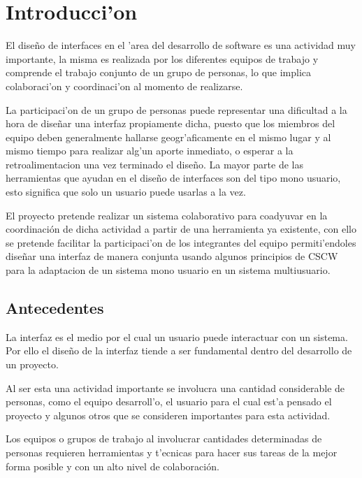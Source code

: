 \chapter{Introducci'on}
\label{capitulouno}

El dise\~no de interfaces en el 'area del desarrollo de software es una actividad muy importante, la misma es realizada por los diferentes equipos de trabajo y comprende el trabajo conjunto de un grupo de personas, lo que implica colaboraci'on y coordinaci'on al momento de realizarse.

\medskip

La participaci'on de un grupo de personas puede representar una dificultad a la hora de dise\~nar una interfaz propiamente dicha, puesto que los miembros del equipo deben generalmente hallarse geogr'aficamente en el mismo lugar y al mismo tiempo para realizar alg'un aporte inmediato, o esperar a la retroalimentacion una vez terminado el dise\~no. La mayor parte de las herramientas que ayudan en el dise\~no de interfaces son del tipo mono usuario, esto significa que solo un usuario puede usarlas a la vez.

\medskip

El proyecto pretende realizar un sistema colaborativo para coadyuvar en la coordinación de dicha actividad a partir de una herramienta ya existente, con ello se pretende facilitar la participaci'on de los integrantes del equipo permiti'endoles dise\~nar una interfaz de manera conjunta usando algunos principios de CSCW para la adaptacion de un sistema mono usuario en un sistema multiusuario.


\section{Antecedentes}

La interfaz es el medio por el cual un usuario puede interactuar con un sistema. Por ello el dise\~no de la interfaz tiende a ser fundamental dentro del desarrollo de un proyecto.

\medskip
 
Al ser esta una actividad importante se involucra una cantidad considerable de personas, como el equipo desarroll'o, el usuario para el cual est'a pensado el proyecto y algunos otros que se consideren importantes para esta actividad.

Los equipos o grupos de trabajo al involucrar cantidades determinadas de personas requieren herramientas y t'ecnicas para hacer sus tareas de la mejor forma posible y con un alto nivel de colaboración.

